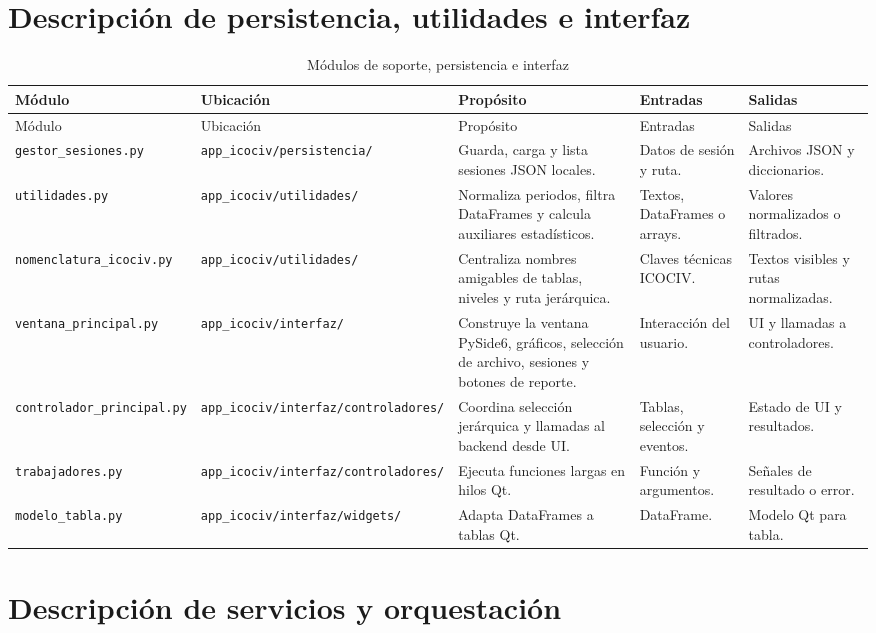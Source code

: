 \documentclass[12pt,letterpaper]{article}
\begin{document}
\section{Descripción de persistencia, utilidades e interfaz}

\begin{longtable}{p{}p{}p{}p{}p{}}
\caption{Módulos de soporte, persistencia e interfaz}
\label{tab:modulos_soporte_interfaz}\\
\toprule
Módulo & Ubicación & Propósito & Entradas & Salidas \\
\midrule
\endfirsthead
\toprule
Módulo & Ubicación & Propósito & Entradas & Salidas \\
\midrule
\endhead
\texttt{gestor\_sesiones.py} & \texttt{app\_icociv/persistencia/} & Guarda, carga y lista sesiones JSON locales. & Datos de sesión y ruta. & Archivos JSON y diccionarios. \\
\texttt{utilidades.py} & \texttt{app\_icociv/utilidades/} & Normaliza periodos, filtra DataFrames y calcula auxiliares estadísticos. & Textos, DataFrames o arrays. & Valores normalizados o filtrados. \\
\texttt{nomenclatura\_icociv.py} & \texttt{app\_icociv/utilidades/} & Centraliza nombres amigables de tablas, niveles y ruta jerárquica. & Claves técnicas ICOCIV. & Textos visibles y rutas normalizadas. \\
\texttt{ventana\_principal.py} & \texttt{app\_icociv/interfaz/} & Construye la ventana PySide6, gráficos, selección de archivo, sesiones y botones de reporte. & Interacción del usuario. & UI y llamadas a controladores. \\
\texttt{controlador\_principal.py} & \texttt{app\_icociv/interfaz/controladores/} & Coordina selección jerárquica y llamadas al backend desde UI. & Tablas, selección y eventos. & Estado de UI y resultados. \\
\texttt{trabajadores.py} & \texttt{app\_icociv/interfaz/controladores/} & Ejecuta funciones largas en hilos Qt. & Función y argumentos. & Señales de resultado o error. \\
\texttt{modelo\_tabla.py} & \texttt{app\_icociv/interfaz/widgets/} & Adapta DataFrames a tablas Qt. & DataFrame. & Modelo Qt para tabla. \\
\bottomrule
\end{longtable}

\section{Descripción de servicios y orquestación}
\end{document}
